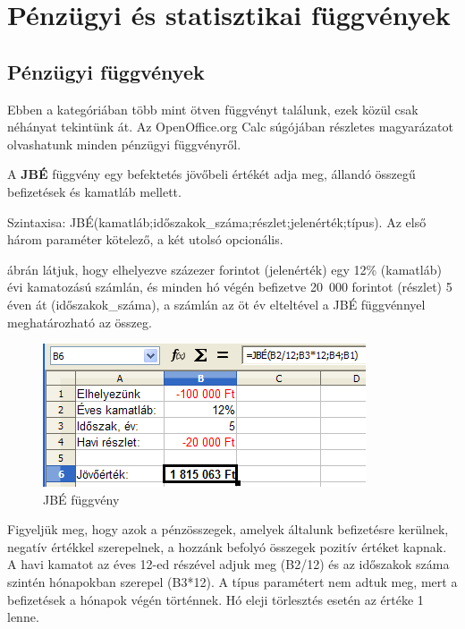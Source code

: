 \chapter{Pénzügyi és statisztikai függvények}
\thispagestyle{empty}

\section{Pénzügyi függvények}

Ebben a kategóriában több mint ötven függvényt találunk,
ezek közül csak néhányat tekintünk át. Az OpenOffice.org
Calc súgójában részletes magyarázatot olvashatunk minden
pénzügyi függvényről.

A \textbf{JBÉ} függvény egy befektetés jövőbeli
értékét adja meg, állandó összegű
befizetések és kamatláb mellett.

Szintaxisa: JBÉ(kamatláb;időszakok\_száma;részlet;jelenérték;típus).
Az első három paraméter kötelező, a két utolsó opcionális.

 ábrán látjuk, hogy elhelyezve százezer forintot
(jelenérték) egy 12\% (kamatláb) évi kamatozású számlán,
és minden hó végén befizetve 20~000 forintot (részlet) 5
éven át (időszakok\_száma), a számlán az öt év
elteltével a JBÉ függvénnyel meghatározható az összeg. 

\begin{figure}[!h]
\begin{center}
\includegraphics[width=9.55cm]{oocalcv2-img125.png}
\caption{JBÉ függvény}\label{FVFüggvény}
\end{center}
\end{figure}

Figyeljük meg, hogy azok a pénzösszegek, amelyek általunk
befizetésre kerülnek, negatív értékkel szerepelnek, a
hozzánk befolyó összegek pozitív értéket kapnak. A havi
kamatot az éves 12-ed részével adjuk meg (B2/12) és az
időszakok száma szintén hónapokban szerepel (B3*12). A
típus paramétert nem adtuk meg, mert a befizetések a hónapok
végén történnek. Hó eleji törlesztés esetén az
értéke 1 lenne.

